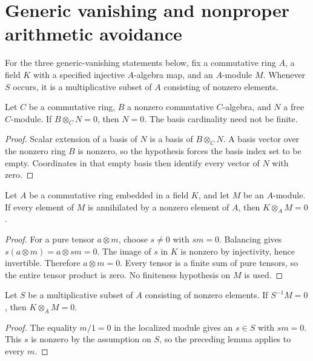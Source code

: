 \section{Generic vanishing and nonproper arithmetic avoidance}

For the three generic-vanishing statements below, fix a commutative ring $A$, a field $K$
with a specified injective $A$-algebra map, and an $A$-module $M$.
Whenever $S$ occurs, it is a multiplicative subset of $A$ consisting of
nonzero elements.

\begin{lemma}\label{lem:kn-arithmetic-free-fibre-detection}
\leanok
Let $C$ be a commutative ring, $B$ a nonzero commutative $C$-algebra,
and $N$ a free $C$-module.  If $B\otimes_C N=0$, then $N=0$.
The basis cardinality need not be finite.
\end{lemma}
\begin{proof}
Scalar extension of a basis of $N$ is a basis of $B\otimes_C N$.
A basis vector over the nonzero ring $B$ is nonzero, so the hypothesis
forces the basis index set to be empty.  Coordinates in that empty basis
then identify every vector of $N$ with zero.
\end{proof}

\begin{lemma}\label{lem:kn-relative-arithmetic-torsion-base-change}
\leanok
Let $A$ be a commutative ring embedded in a field $K$, and let $M$ be
an $A$-module.  If every element of $M$ is annihilated by a nonzero
element of $A$, then $K\otimes_A M=0$.
\end{lemma}
\begin{proof}
For a pure tensor $a\otimes m$, choose $s\ne0$ with $sm=0$.
Balancing gives $s(a\otimes m)=a\otimes sm=0$.  The image of $s$ in
$K$ is nonzero by injectivity, hence invertible.  Therefore
$a\otimes m=0$.  Every tensor is a finite sum of pure tensors, so the
entire tensor product is zero.  No finiteness hypothesis on $M$ is used.
\end{proof}

\begin{theorem}\label{thm:kn-relative-arithmetic-localized-generic-vanishing}
\leanok
{}
Let $S$ be a multiplicative subset of $A$ consisting of nonzero elements.
If $S^{-1}M=0$, then $K\otimes_A M=0$.
\end{theorem}
\begin{proof}
The equality $m/1=0$ in the localized module gives an $s\in S$ with
$sm=0$.  This $s$ is nonzero by the assumption on $S$, so the preceding
lemma applies to every $m$.
\end{proof}

